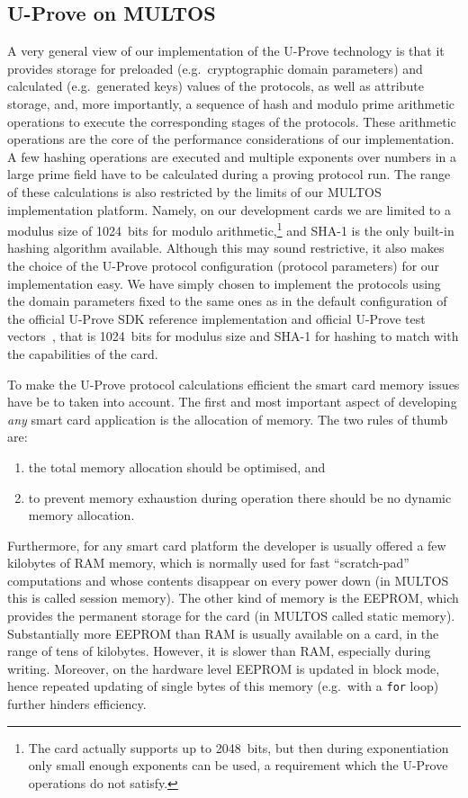 \subsection{U-Prove on MULTOS}

A very general view of our implementation of the U-Prove technology is that it
provides storage for preloaded (e.g.\ cryptographic domain parameters) and
calculated (e.g.\ generated keys) values of the protocols, as well as attribute
storage, and, more importantly, a sequence of hash and modulo prime arithmetic
operations to execute the corresponding stages of the protocols. These
arithmetic operations are the core of the performance considerations of our
implementation. A few hashing operations are executed and multiple exponents
over numbers in a large prime field have to be calculated during a proving
protocol run. The range of these calculations is also restricted by the limits
of our MULTOS implementation platform. Namely, on our development cards we are
limited to a modulus size of 1024~bits for modulo arithmetic,\footnote{The card
actually supports up to 2048~bits, but then during exponentiation only small
enough exponents can be used, a requirement which the U-Prove operations do not
satisfy.} and SHA-1 is the only built-in hashing algorithm available. Although
this may sound restrictive, it also makes the choice of the U-Prove protocol
configuration (protocol parameters) for our implementation easy. We have simply
chosen to implement the protocols using the domain parameters fixed to the same
ones as in the default configuration of the official U-Prove SDK reference
implementation and official U-Prove test vectors~\cite{U-Prove_Vectors2011},
that is 1024~bits for modulus size and SHA-1 for hashing to match with the
capabilities of the card.

To make the U-Prove protocol calculations efficient the smart card memory issues
have be to taken into account. The first and most important aspect of developing
\emph{any} smart card application is the allocation of memory. The two rules of
thumb are:
\begin{enumerate}
  \item the total memory allocation should be optimised, and
  \item to prevent memory exhaustion during operation there should be no
    dynamic memory allocation.
\end{enumerate}
Furthermore, for any smart card platform the developer is usually offered a few
kilobytes of RAM memory, which is normally used for fast ``scratch-pad''
computations and whose contents disappear on every power down (in MULTOS this is
called session memory). The other kind of memory is the EEPROM, which provides
the permanent storage for the card (in MULTOS called static memory).
Substantially more EEPROM than RAM is usually available on a card, in the range
of tens of kilobytes. However, it is slower than RAM, especially during writing.
Moreover, on the hardware level EEPROM is updated in block mode, hence repeated
updating of single bytes of this memory (e.g.\ with a \lstinline{for} loop)
further hinders efficiency.

